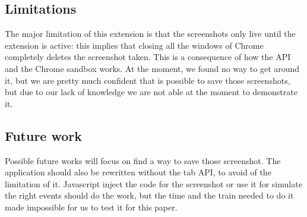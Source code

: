 \documentclass[12pt]{article}
\begin{document}
\begin{multicols}{2}
\subsection*{Limitations}
The major limitation of this extension is that the screenshots only live until the extension is active: this implies that closing all the windows of Chrome completely deletes the screenshot taken.
This is a consequence of how the API and the Chrome sandbox works. At the moment, we found no way to get around it, but we are pretty much confident that is possible to save those screenshots, but due to our lack of knowledge we are not able at the moment to demonstrate it.
\subsection*{Future work}
Possible future works will focus on find a way to save those screenshot.
The application should also be rewritten without the tab API, to avoid of the limitation of it.
Javascript inject the code for the screenshot or use it for simulate the right events should do the work, but the time and the train needed to do it made impossible for us to test it for this paper.

\end{multicols}
\end{document}
